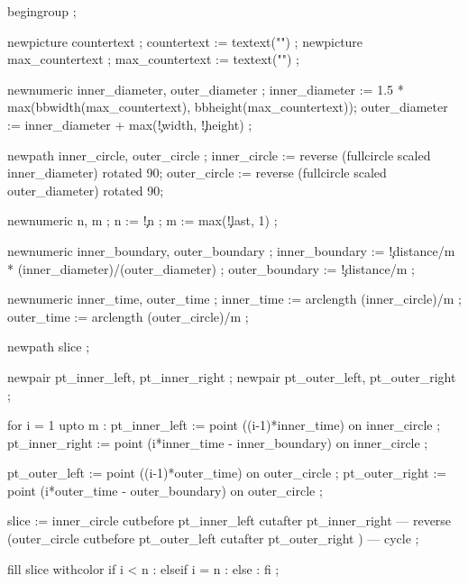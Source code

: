   begingroup ;

  newpicture countertext     ; countertext     := textext("\getvisualcountertext")    ;
  newpicture max_countertext ; max_countertext := textext("\getmaxvisualcountertext") ;

  newnumeric inner_diameter, outer_diameter ;
  inner_diameter := 1.5 * max(bbwidth(max_countertext), bbheight(max_countertext));
  outer_diameter := inner_diameter + 
          max(\visualcounterparameter\c!width, \visualcounterparameter\c!height) ;

  newpath inner_circle, outer_circle ;
  inner_circle := reverse (fullcircle scaled inner_diameter) rotated 90;
  outer_circle := reverse (fullcircle scaled outer_diameter) rotated 90;

  newnumeric n, m ;
  n := \visualcounterparameter\c!n ;
  m := max(\visualcounterparameter\c!last, 1) ;

  newnumeric inner_boundary, outer_boundary ;
  inner_boundary := \visualcounterparameter\c!distance/m * (inner_diameter)/(outer_diameter) ;
  outer_boundary := \visualcounterparameter\c!distance/m ;

  newnumeric inner_time, outer_time ;
  inner_time := arclength (inner_circle)/m ;
  outer_time := arclength (outer_circle)/m ;

  newpath slice ;

  newpair pt_inner_left, pt_inner_right ;
  newpair pt_outer_left, pt_outer_right ;

  for i = 1 upto m : 
    pt_inner_left  := point ((i-1)*inner_time)               on inner_circle ;
    pt_inner_right := point (i*inner_time - inner_boundary)  on inner_circle ;

    pt_outer_left  := point ((i-1)*outer_time)               on outer_circle ;
    pt_outer_right := point (i*outer_time - outer_boundary)  on outer_circle ;

    slice := inner_circle cutbefore pt_inner_left cutafter pt_inner_right 
       --- reverse (outer_circle cutbefore pt_outer_left cutafter pt_outer_right ) 
       --- cycle ;

    fill slice withcolor 
      if i < n     :  
      elseif i = n : 
      else         : 
      fi ;

